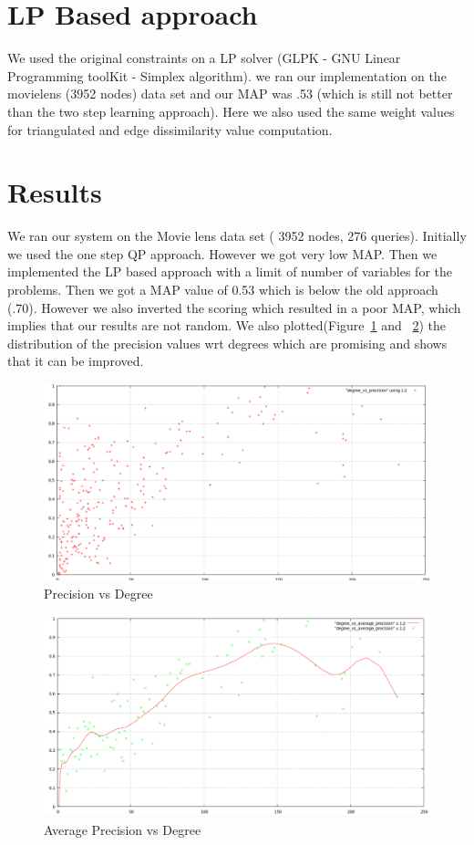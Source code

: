 \section*{LP Based approach}
We used the original constraints on a LP solver (GLPK - GNU Linear Programming toolKit - Simplex algorithm). we ran our implementation on the movielens (3952 nodes) data set and our MAP was .53 (which is still not better than the two step learning approach). Here we also used the same weight values for triangulated and edge dissimilarity value computation.

\section*{Results}
We ran our system on the Movie lens data set ( 3952 nodes, 276 queries). Initially we used the one step QP approach. However we got very low MAP. Then we implemented the LP based approach with a limit of number of variables for the problems. Then we got a MAP value of 0.53 which is below the old approach (.70). However we also inverted the scoring which resulted in a poor MAP, which implies that our results are not random. We also plotted(Figure~\ref{fig:precisiondegree} and ~\ref{fig:averageprecisiondegree}) the distribution of the precision values wrt degrees which are promising and shows that it can be improved.
\begin{figure}
\centering
\includegraphics[width=\textwidth,height=\textheight,keepaspectratio]{link_prediction/images/total.png}
\caption{Precision vs Degree}
\label{fig:precisiondegree}
\end{figure}
\begin{figure}
\centering
\includegraphics[width=\textwidth,height=\textheight,keepaspectratio]{link_prediction/images/average.png}
\caption{Average Precision vs Degree}
\label{fig:averageprecisiondegree}
\end{figure}

